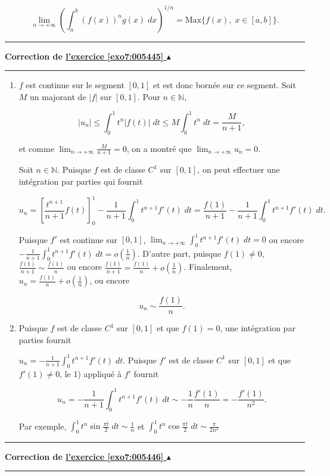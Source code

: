 \documentclass[11pt,a4paper]{article}
\newcommand{\Nn}{\mathbb{N}} \newcommand{\N}{\mathbb{N}}
\newcounter{exo}
\newcommand{\correction}[1]{\hypertarget{cor7:#1}{}\label{cor7:#1}{\bf Correction de \hyperlink{exo7:#1}{l'exercice \ref{exo7:#1} $\blacktriangle$}}\vspace{1mm}\hrule\vspace{1mm}}
\newcommand{\fincorrection}{\vspace{1mm}\hrule\vspace*{7mm}}
\begin{document}
$$\lim_{n\rightarrow +\infty}\left(\int_{a}^{b}(f(x))^ng(x)\;dx\right)^{1/n}=\mbox{Max}\{f(x),\;x\in[a,b]\}.$$

\fincorrection
\correction{005445}
\begin{enumerate}
\item  $f$ est continue sur le segment $[0,1]$ et est donc bornée sur ce segment. Soit $M$ un majorant de $|f|$ sur $[0,1]$. Pour $n\in\Nn$,

$$|u_n|\leq\int_{0}^{1}t^n|f(t)|\;dt\leq M\int_{0}^{1}t^n\;dt=\frac{M}{n+1},$$

et comme $\lim_{n\rightarrow +\infty}\frac{M}{n+1}=0$, on a montré que $\lim_{n\rightarrow +\infty}u_n=0$.

Soit $n\in\Nn$. Puisque $f$ est de classe $C^1$ sur $[0,1]$, on peut effectuer une intégration par parties qui fournit

$$u_n=\left[\frac{t^{n+1}}{n+1}f(t)\right]_{0}^{1}-\frac{1}{n+1}\int_{0}^{1}t^{n+1}f'(t)\;dt=\frac{f(1)}{n+1}-\frac{1}{n+1}\int_{0}^{1}t^{n+1}f'(t)\;dt.$$

Puisque $f'$ est continue sur $[0,1]$, $\lim_{n\rightarrow +\infty}\int_{0}^{1}t^{n+1}f'(t)\;dt=0$ ou encore $-\frac{1}{n+1}\int_{0}^{1}t^{n+1}f'(t)\;dt=o(\frac{1}{n})$. D'autre part, puisque $f(1)\neq0$, $\frac{f(1)}{n+1}\sim\frac{f(1)}{n}$ ou encore $\frac{f(1)}{n+1}=\frac{f(1)}{n}+o(\frac{1}{n})$. Finalement, $u_n=\frac{f(1)}{n}+o(\frac{1}{n})$, ou encore

$$u_n\sim\frac{f(1)}{n}.$$

\item  Puisque $f$ est de classe $C^1$ sur $[0,1]$ et que $f(1)=0$, une intégration par parties fournit

$u_n=-\frac{1}{n+1}\int_{0}^{1}t^{n+1}f'(t)\;dt$. Puisque $f'$ est de classe $C^1$ sur $[0,1]$ et que $f'(1)\neq0$, le 1) appliqué à $f'$ fournit

$$u_n=-\frac{1}{n+1}\int_{0}^{1}t^{n+1}f'(t)\;dt\sim-\frac{1}{n}\frac{f'(1)}{n}=-\frac{f'(1)}{n^2}.$$

Par exemple, $\int_{0}^{1}t^n\sin\frac{\pi t}{2}\;dt\sim\frac{1}{n}$ et $\int_{0}^{1}t^n\cos\frac{\pi t}{2}\;dt\sim\frac{\pi}{2n^2}$
\end{enumerate}

\fincorrection
\correction{005446}
\end{document}
